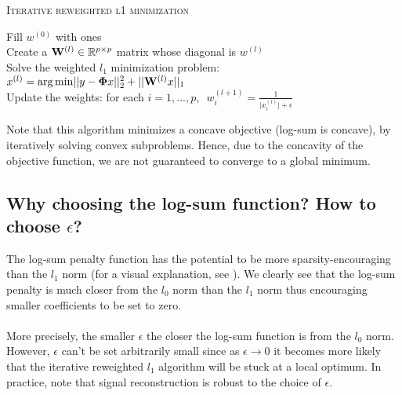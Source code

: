 \documentclass[a4paper,10pt]{article}
\theoremstyle{definition}
\begin{document}
{\fontsize{4}{4}\selectfont
\begin{algorithm}[h]  %
\caption{\textsc{Iterative reweighted l1 minimization}
}
%

    Fill $w^{(0)}$ with ones \\
    {
        Create a $\mathbf{W}^{(l)} \in \mathbb{R}^{p\times p}$ matrix whose diagonal is $w^{(l)}$ \\
        Solve the weighted $l_1$ minimization problem: $x^{(l)} = \operatorname*{arg\,min} \lvert\lvert y -  \mathbf{\Phi} x\rvert\rvert_2^2 + \lvert\lvert \mathbf{W}^{(l)}x\rvert\rvert_1$ \\
        Update the weights: for each $i = 1, ..., p, \enspace w_i^{(l+1)} = \frac{1}{\lvert x_i^{(l)} \rvert + \epsilon}$
    }

\end{algorithm}
}

\vskip 0.2in

Note that this algorithm minimizes a concave objective (log-sum is concave), by iteratively solving convex subproblems. Hence, due to the concavity of the objective function, we
are not guaranteed to converge to a global minimum.

\subsection*{Why choosing the log-sum function? How to choose $\epsilon$?}

The log-sum penalty function has the potential to be more sparsity-encouraging than the $l_1$ norm (for a visual explanation, see \cite{Candes_Wakin_Boyd08}). We clearly see
that the log-sum penalty is much closer from the $l_0$ norm than the $l_1$ norm thus encouraging smaller coefficients to be set to zero.
\\
\\
More precisely, the smaller $\epsilon$ the closer the log-sum function is from the $l_0$ norm. However, $\epsilon$ can't be set arbitrarily small since as $\epsilon \rightarrow 0$ it
becomes more likely that the iterative reweighted $l_1$ algorithm will be stuck at a local optimum. In practice, note that signal reconstruction is robust to the choice of $\epsilon$.
\end{document}
